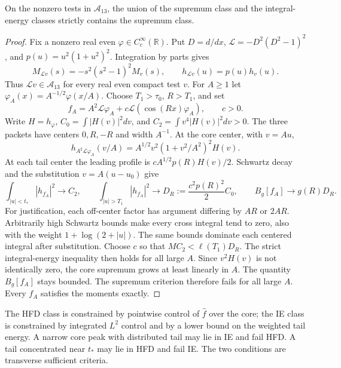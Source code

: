 \begin{proposition}
\label{v4-arith:w7-e:prop:strict-inclusion}
On the nonzero tests in $\mathscr A_{13}$, the union of the
supremum class and the integral-energy classes strictly contains
the supremum class.
\end{proposition}
\begin{proof}
Fix a nonzero real even $\varphi\in C_c^\infty(\mathbb R)$.
Put $D=d/dx$, $\mathcal L=-D^2(D^2-1)^2$, and
$p(u)=u^2(1+u^2)^2$. Integration by parts gives
\[
 M_{\mathcal Lv}(s)=-s^2(s^2-1)^2M_v(s),\qquad
 h_{\mathcal Lv}(u)=p(u)h_v(u).
\]
Thus $\mathcal Lv\in\mathscr A_{13}$ for every real even compact test $v$.
For $A\ge1$ let $\varphi_A(x)=A^{-1/2}\varphi(x/A)$.
Choose $T_1>\tau_0$, $R>T_1$, and set
\[
 f_A=A^2\mathcal L\varphi_A
           +c\mathcal L(\cos(Rx)\varphi_A),\qquad c>0.
\]
Write $H=h_\varphi$, $C_0=\int|H(v)|^2dv$, and
$C_2=\int v^4|H(v)|^2dv>0$.
The three packets have centers $0,R,-R$ and width $A^{-1}$.
At the core center, with $v=Au$,
\[
 h_{A^2\mathcal L\varphi_A}(v/A)
 =A^{1/2}v^2(1+v^2/A^2)^2H(v).
\]
At each tail center the leading profile is
$cA^{1/2}p(R)H(v)/2$.
Schwartz decay and the substitution $v=A(u-u_0)$ give
\[
 \int_{|u|<t_*}|h_{f_A}|^2\to C_2,\qquad
 \int_{|u|>T_1}|h_{f_A}|^2\to D_R:=\frac{c^2p(R)^2}2C_0,
 \qquad B_g[f_A]\to g(R)D_R.
\]
For justification, each off-center factor has argument differing by
$AR$ or $2AR$. Arbitrarily high Schwartz bounds make every cross
integral tend to zero, also with the weight $1+\log(2+|u|)$.
The same bounds dominate each centered integral after substitution.
Choose $c$ so that $MC_2<\ell(T_1)D_R$.
The strict integral-energy inequality then holds for all large $A$.
Since $v^2H(v)$ is not identically zero, the core supremum grows
at least linearly in $A$. The quantity $B_g[f_A]$ stays bounded.
The supremum criterion therefore fails for all large $A$.
Every $f_A$ satisfies the moments exactly.
\end{proof}

\begin{remark}
\label{v4-arith:w7-e:rem:IE-advantage}
The HFD class is constrained by pointwise control of \(\widehat{f}\)
over the core; the IE class is constrained by integrated \(L^{2}\)
control and by a lower bound on the weighted tail energy. A narrow core peak with distributed
tail may lie in IE and fail HFD. A tail concentrated near
\(t_{\ast}\) may lie in HFD and fail IE. The two conditions are
transverse sufficient criteria.
\end{remark}

